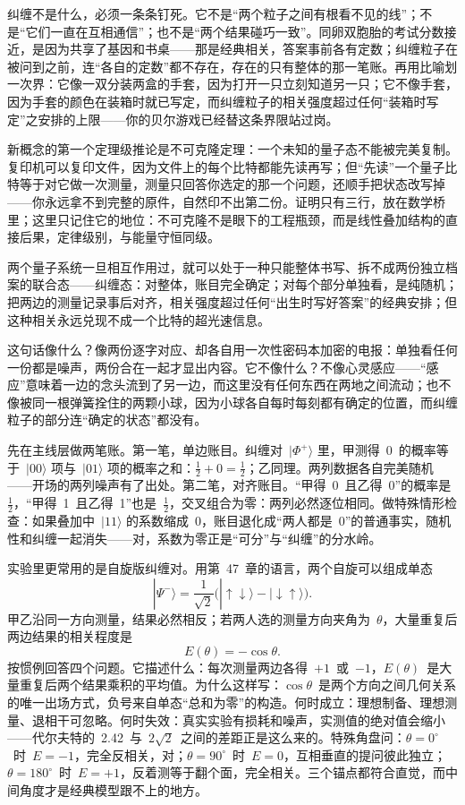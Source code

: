 纠缠不是什么，必须一条条钉死。它不是“两个粒子之间有根看不见的线”；不是“它们一直在互相通信”；也不是“两个结果碰巧一致”。同卵双胞胎的考试分数接近，是因为共享了基因和书桌——那是经典相关，答案事前各有定数；纠缠粒子在被问到之前，连“各自的定数”都不存在，存在的只有整体的那一笔账。再用比喻划一次界：它像一双分装两盒的手套，因为打开一只立刻知道另一只；它不像手套，因为手套的颜色在装箱时就已写定，而纠缠粒子的相关强度超过任何“装箱时写定”之安排的上限——你的贝尔游戏已经替这条界限站过岗。

新概念的第一个定理级推论是不可克隆定理：一个未知的量子态不能被完美复制。复印机可以复印文件，因为文件上的每个比特都能先读再写；但“先读”一个量子比特等于对它做一次测量，测量只回答你选定的那一个问题，还顺手把状态改写掉——你永远拿不到完整的原件，自然印不出第二份。证明只有三行，放在数学桥里；这里只记住它的地位：不可克隆不是眼下的工程瓶颈，而是线性叠加结构的直接后果，定律级别，与能量守恒同级。


\begin{oneline}
两个量子系统一旦相互作用过，就可以处于一种只能整体书写、拆不成两份独立档案的联合态——纠缠态：对整体，账目完全确定；对每个部分单独看，是纯随机；把两边的测量记录事后对齐，相关强度超过任何“出生时写好答案”的经典安排；但这种相关永远兑现不成一个比特的超光速信息。
\end{oneline}

这句话像什么？像两份逐字对应、却各自用一次性密码本加密的电报：单独看任何一份都是噪声，两份合在一起才显出内容。它不像什么？不像心灵感应——“感应”意味着一边的念头流到了另一边，而这里没有任何东西在两地之间流动；也不像被同一根弹簧拴住的两颗小球，因为小球各自每时每刻都有确定的位置，而纠缠粒子的部分连“确定的状态”都没有。


先在主线层做两笔账。第一笔，单边账目。纠缠对~\(|\Phi^{+}\rangle\) 里，甲测得~0~的概率等于~\(|00\rangle\) 项与~\(|01\rangle\) 项的概率之和：\(\tfrac12+0=\tfrac12\)；乙同理。两列数据各自完美随机——开场的两列噪声有了出处。第二笔，对齐账目。“甲得~0~且乙得~0”的概率是~\(\tfrac12\)，“甲得~1~且乙得~1”也是~\(\tfrac12\)，交叉组合为零：两列必然逐位相同。做特殊情形检查：如果叠加中~\(|11\rangle\) 的系数缩成~0，账目退化成“两人都是~0”的普通事实，随机性和纠缠一起消失——对，系数为零正是“可分”与“纠缠”的分水岭。

实验里更常用的是自旋版纠缠对。用第~47~章的语言，两个自旋可以组成单态
\[
|\Psi^{-}\rangle=\frac{1}{\sqrt2}\big(|{\uparrow\downarrow}\rangle-|{\downarrow\uparrow}\rangle\big).
\]
甲乙沿同一方向测量，结果必然相反；若两人选的测量方向夹角为~\(\theta\)，大量重复后两边结果的相关程度是
\[
E(\theta)=-\cos\theta .
\]
按惯例回答四个问题。它描述什么：每次测量两边各得~\(+1\)~或~\(-1\)，\(E(\theta)\)~是大量重复后两个结果乘积的平均值。为什么这样写：\(\cos\theta\)~是两个方向之间几何关系的唯一出场方式，负号来自单态“总和为零”的构造。何时成立：理想制备、理想测量、退相干可忽略。何时失效：真实实验有损耗和噪声，实测值的绝对值会缩小——代尔夫特的~2.42~与~\(2\sqrt2\)~之间的差距正是这么来的。特殊角盘问：\(\theta=0^\circ\)~时~\(E=-1\)，完全反相关，对；\(\theta=90^\circ\)~时~\(E=0\)，互相垂直的提问彼此独立；\(\theta=180^\circ\)~时~\(E=+1\)，反着测等于翻个面，完全相关。三个锚点都符合直觉，而中间角度才是经典模型跟不上的地方。

